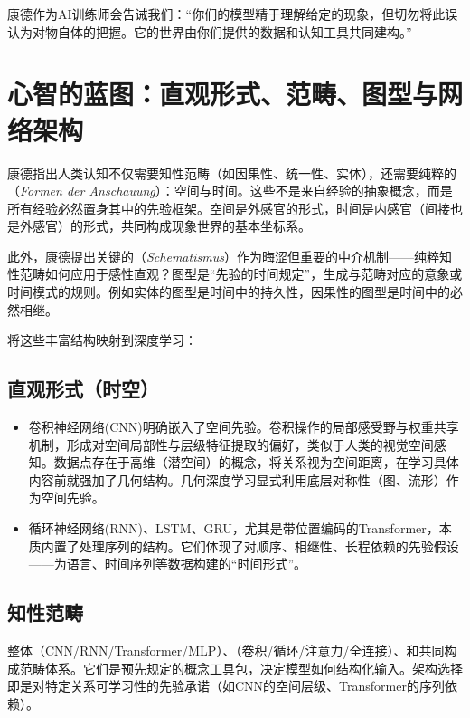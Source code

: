 康德作为AI训练师会告诫我们：“你们的模型精于理解给定的现象，但切勿将此误认为对物自体的把握。它的世界由你们提供的数据和认知工具共同建构。”

\section{心智的蓝图：直观形式、范畴、图型与网络架构}

康德指出人类认知不仅需要知性范畴（如因果性、统一性、实体），还需要纯粹的（\textit{Formen der Anschauung}）：空间与时间。这些不是来自经验的抽象概念，而是所有经验必然置身其中的先验框架。空间是外感官的形式，时间是内感官（间接也是外感官）的形式，共同构成现象世界的基本坐标系。

此外，康德提出关键的（\textit{Schematismus}）作为晦涩但重要的中介机制——纯粹知性范畴如何应用于感性直观？图型是“先验的时间规定”，生成与范畴对应的意象或时间模式的规则。例如实体的图型是时间中的持久性，因果性的图型是时间中的必然相继。

将这些丰富结构映射到深度学习：

\subsection*{直观形式（时空）}
\begin{itemize}
\item{} 卷积神经网络(CNN)明确嵌入了空间先验。卷积操作的局部感受野与权重共享机制，形成对空间局部性与层级特征提取的偏好，类似于人类的视觉空间感知。数据点存在于高维（潜空间）的概念，将关系视为空间距离，在学习具体内容前就强加了几何结构。几何深度学习显式利用底层对称性（图、流形）作为空间先验。
\item{} 循环神经网络(RNN)、LSTM、GRU，尤其是带位置编码的Transformer，本质内置了处理序列的结构。它们体现了对顺序、相继性、长程依赖的先验假设——为语言、时间序列等数据构建的“时间形式”。
\end{itemize}

\subsection*{知性范畴}
整体（CNN/RNN/Transformer/MLP）、（卷积/循环/注意力/全连接）、和共同构成范畴体系。它们是预先规定的概念工具包，决定模型如何结构化输入。架构选择即是对特定关系可学习性的先验承诺（如CNN的空间层级、Transformer的序列依赖）。

